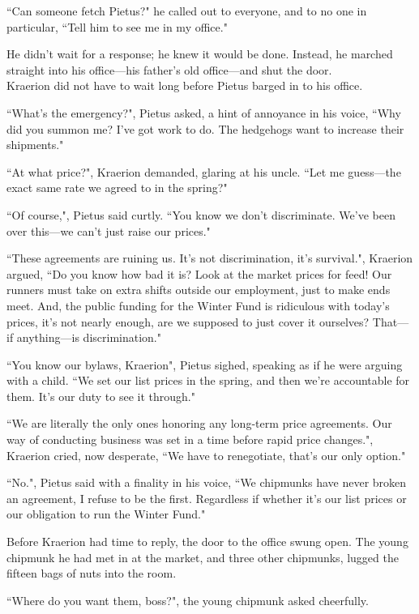 ``Can someone fetch Pietus?" he called out to everyone, and to no one in particular, ``Tell him to see me in my office."

He didn't wait for a response; he knew it would be done. Instead, he marched straight into his office---his father's old office---and shut the door.\\

Kraerion did not have to wait long before Pietus barged in to his office.

``What's the emergency?", Pietus asked, a hint of annoyance in his voice, ``Why did you summon me? I've got work to do. The hedgehogs want to increase their shipments."

``At what price?", Kraerion demanded, glaring at his uncle. ``Let me guess---the exact same rate we agreed to in the spring?"

``Of course,", Pietus said curtly. ``You know we don't discriminate. We've been over this---we can't just raise our prices."

``These agreements are ruining us. It's not discrimination, it's survival.", Kraerion argued, ``Do you know how bad it is? Look at the market prices for feed! Our runners must take on extra shifts outside our employment, just to make ends meet. And, the public funding for the Winter Fund is ridiculous with today's prices, it's not nearly enough, are we supposed to just cover it ourselves? That---if anything---is discrimination."

``You know our bylaws, Kraerion", Pietus sighed, speaking as if he were arguing with a child. ``We set our list prices in the spring, and then we're accountable for them. It's our duty to see it through."

``We are literally the only ones honoring any long-term price agreements. Our way of conducting business was set in a time before rapid price changes.", Kraerion cried, now desperate,  ``We have to renegotiate, that's our only option."

``No.", Pietus said with a finality in his voice, ``We chipmunks have never broken an agreement, I refuse to be the first. Regardless if whether it's our list prices or our obligation to run the Winter Fund."

Before Kraerion had time to reply, the door to the office swung open. The young chipmunk he had met in at the market, and three other chipmunks, lugged the fifteen bags of nuts into the room.

``Where do you want them, boss?", the young chipmunk asked cheerfully.

